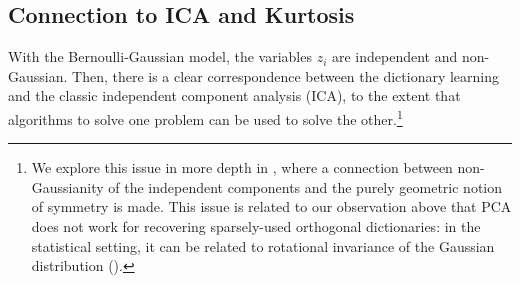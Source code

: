 \documentclass[../../book-main.tex]{subfiles}
\begin{document}
\subsection{Connection to ICA and Kurtosis}
With the Bernoulli-Gaussian model, the variables $z_i$ are
independent and non-Gaussian. Then, there is a clear correspondence
between the dictionary learning and the classic independent component
analysis (ICA), to the extent that algorithms to solve one problem
can be used to solve the other.\footnote{We explore this issue in
    more depth in , where a
    connection between non-Gaussianity of the independent components and
    the purely geometric notion of symmetry is made. This issue is
    related to our observation above that PCA does not work for
    recovering sparsely-used orthogonal dictionaries: in the statistical
    setting, it can be related to rotational invariance of the Gaussian
distribution ().}
\end{document}
